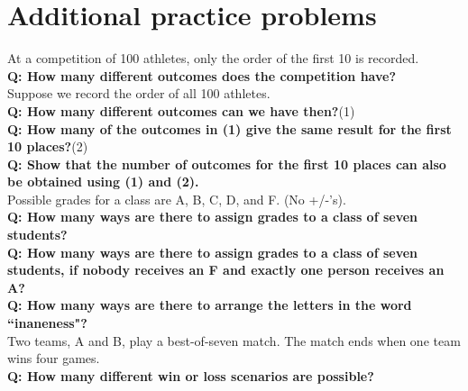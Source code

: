 \documentclass{article}
\begin{document}
\section{\sc Additional practice problems}

At a competition of 100 athletes, only the order of the first 10 is recorded.\\
{\bf Q: How many different outcomes does the competition have?}\\[1ex]
Suppose we record the order of all 100 athletes.\\
{\bf Q: How many different outcomes can we have then?}\hfill(1)\\[1ex]
{\bf Q: How many of the outcomes in {\normalfont(1)} give the same result for the first 10 places?}\hfill(2)\\[1ex]
{\bf Q: Show that the number of outcomes for the first 10 places can also be obtained using {\normalfont(1)} and {\normalfont(2)}.}\\[1em]
Possible grades for a class are A, B, C, D, and F. (No +/-'s).\\
{\bf Q: How many ways are there to assign grades to a class of seven students?}\\[1ex]
{\bf Q: How many ways are there to assign grades to a class of seven students, if nobody receives an F and exactly one person receives an A?}\\[1em]
{\bf Q: How many ways are there to arrange the letters in the word ``inaneness"?}\\[1em]
Two teams, A and B, play a best-of-seven match. The match ends when one team wins four games.\\
{\bf Q: How many different win or loss scenarios are possible?}
\end{document}
